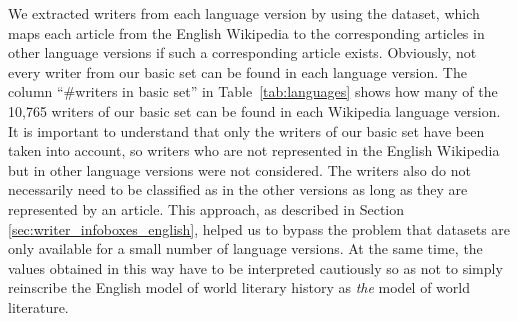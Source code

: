 \documentclass[a4paper,12pt]{scrartcl}
\begin{document}
We extracted writers from each language version by using the
 dataset, which maps each article
from the English Wikipedia to the corresponding articles in other
language versions if such a corresponding article exists.  Obviously,
not every writer from our basic set can be found in each language
version. The column ``\#writers in basic set'' in
Table~\ref{tab:languages} shows how many of the 10,765 writers of our
basic set can be found in each Wikipedia language version. It is
important to understand that only the writers of our basic set have
been taken into account, so writers who are not represented in the
English Wikipedia but in other language versions were not
considered.
The writers also do not necessarily need to be classified
as  in the other %
versions as long as they are represented by an article.
This approach, as described in Section
\ref{sec:writer_infoboxes_english}, helped us to bypass
the problem that  datasets are only available
for a small number of language versions. At the same time, the
values obtained in this way have to be interpreted cautiously
so as not to simply reinscribe the English model of world literary
history as \emph{the} model of world literature.





\end{document}
